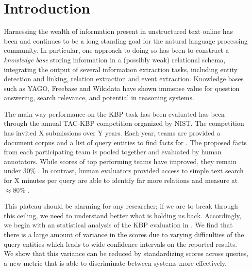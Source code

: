 \section{Introduction}
\label{sec:intro}

Harnessing the wealth of information present in unstructured text online has been and continues to be a long standing goal for the natural language processing community.
In particular, one approach to doing so has been to construct a \textit{knowledge base} storing information in a (possibly weak) relational schema, integrating the output of several information extraction tasks, including entity detection and linking, relation extraction and event extraction.
Knowledge bases such as YAGO, Freebase and Wikidata have shown immense value for question answering, search relevance, and potential in reasoning systems\needcite.


The main way performance on the KBP task has been evaluated has been through the annual TAC-KBP competition organized by NIST.\@
The competition has invited X submissions over Y years.
Each year, teams are provided a document corpus and a list of query entities to find facts for .
The proposed facts from each participating team is pooled together and evaluated by human annotators.
While scores of top performing teams have improved, they remain under 30\% \fone.
In contrast, human evaluators provided access to simple text search for X minutes per query are able to identify far more relations and measure at $\approx$80\% \fone.

This plateau should be alarming for any researcher; if we are to break through this ceiling, we need to understand better what is holding us back.
Accordingly, we begin with an statistical analysis of the KBP evaluation in .
We find that there is a large amount of variance in the scores due to varying difficulties of the query entities which leads to wide confidence intervals on the reported results.
We show that this variance can be reduced by standardizing scores across queries, a new metric that is able to discriminate between systems  more effectively. 

